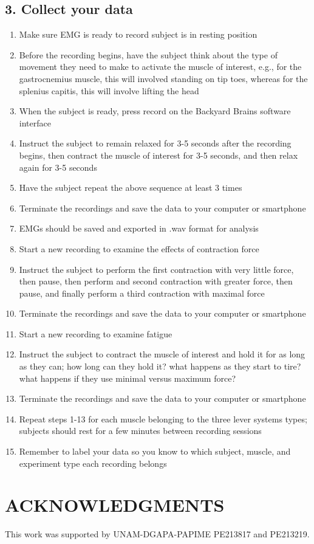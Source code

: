 \documentclass[12pt]{article}
\begin{document}
\subsection*{3. Collect your data}

\begin{enumerate}
\item Make sure EMG is ready to record subject is in resting position
\item Before the recording begins, have the subject think about the type of movement they need to make to activate the muscle of interest, e.g., for the gastrocnemius muscle, this will involved standing on tip toes, whereas for the splenius capitis, this will involve lifting the head
\item When the subject is ready, press record on the Backyard Brains software interface
\item Instruct the subject to remain relaxed for 3-5 seconds after the recording begins, then contract the muscle of interest for 3-5 seconds, and then relax again for 3-5 seconds
\item Have the subject repeat the above sequence at least 3 times 
\item Terminate the recordings and save the data to your computer or smartphone
\item EMGs should be saved and exported in .wav format for analysis
\item Start a new recording to examine the effects of contraction force
\item Instruct the subject to perform the first contraction with very little force, then pause, then perform and second contraction with greater force, then pause, and finally perform a third contraction with maximal force
\item Terminate the recordings and save the data to your computer or smartphone
\item Start a new recording to examine fatigue
\item Instruct the subject to contract the muscle of interest and hold it for as long as they can; how long can they hold it? what happens as they start to tire? what happens if they use minimal versus maximum force?
\item Terminate the recordings and save the data to your computer or smartphone
\item Repeat steps 1-13 for each muscle belonging to the three lever systems types; subjects should rest for a few minutes between recording sessions
\item Remember to label your data so you know to which subject, muscle, and experiment type each recording belongs
\end{enumerate}

\section*{ACKNOWLEDGMENTS}
This work was supported by UNAM-DGAPA-PAPIME PE213817 and PE213219.

\renewcommand\refname{REFERENCES}
\renewcommand{\markboth}[2]{}%
\begin{footnotesize}

\end{footnotesize}
\end{document}
